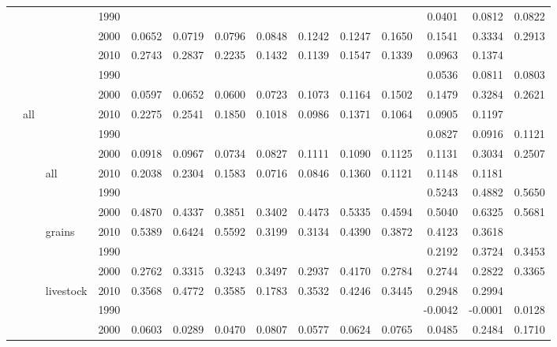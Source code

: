 \documentclass[]{elsarticle} %
\begin{document}
\begin{landscape}
\begin{longtable}[t]{>{}llllrrrrrrrrrr}
\endfoot
\bottomrule
\endlastfoot
 &  &  & 1990 &  &  &  &  &  &  &  & 0.0401 & 0.0812 & 0.0822\\
\nopagebreak
 &  &  & 2000 & 0.0652 & 0.0719 & 0.0796 & 0.0848 & 0.1242 & 0.1247 & 0.1650 & 0.1541 & 0.3334 & 0.2913\\
\nopagebreak
\multirow[t]{-3}{*}{\raggedright\arraybackslash \textbf{all}} &  &  & 2010 & 0.2743 & 0.2837 & 0.2235 & 0.1432 & 0.1139 & 0.1547 & 0.1339 & 0.0963 & 0.1374 & \\
\nopagebreak
 &  &  & 1990 &  &  &  &  &  &  &  & 0.0536 & 0.0811 & 0.0803\\
\nopagebreak
 &  &  & 2000 & 0.0597 & 0.0652 & 0.0600 & 0.0723 & 0.1073 & 0.1164 & 0.1502 & 0.1479 & 0.3284 & 0.2621\\
\nopagebreak
 & \multirow[t]{-6}{*}{\raggedright\arraybackslash all} &  & 2010 & 0.2275 & 0.2541 & 0.1850 & 0.1018 & 0.0986 & 0.1371 & 0.1064 & 0.0905 & 0.1197 & \\
\nopagebreak
 &  &  & 1990 &  &  &  &  &  &  &  & 0.0827 & 0.0916 & 0.1121\\
\nopagebreak
 &  &  & 2000 & 0.0918 & 0.0967 & 0.0734 & 0.0827 & 0.1111 & 0.1090 & 0.1125 & 0.1131 & 0.3034 & 0.2507\\
\nopagebreak
 &  & \multirow[t]{-9}{*}{\raggedright\arraybackslash all} & 2010 & 0.2038 & 0.2304 & 0.1583 & 0.0716 & 0.0846 & 0.1360 & 0.1121 & 0.1148 & 0.1181 & \\
\nopagebreak
 &  &  & 1990 &  &  &  &  &  &  &  & 0.5243 & 0.4882 & 0.5650\\
\nopagebreak
 &  &  & 2000 & 0.4870 & 0.4337 & 0.3851 & 0.3402 & 0.4473 & 0.5335 & 0.4594 & 0.5040 & 0.6325 & 0.5681\\
\nopagebreak
 &  & \multirow[t]{-3}{*}{\raggedright\arraybackslash grains} & 2010 & 0.5389 & 0.6424 & 0.5592 & 0.3199 & 0.3134 & 0.4390 & 0.3872 & 0.4123 & 0.3618 & \\
\nopagebreak
 &  &  & 1990 &  &  &  &  &  &  &  & 0.2192 & 0.3724 & 0.3453\\
\nopagebreak
 &  &  & 2000 & 0.2762 & 0.3315 & 0.3243 & 0.3497 & 0.2937 & 0.4170 & 0.2784 & 0.2744 & 0.2822 & 0.3365\\
\nopagebreak
 &  & \multirow[t]{-3}{*}{\raggedright\arraybackslash livestock} & 2010 & 0.3568 & 0.4772 & 0.3585 & 0.1783 & 0.3532 & 0.4246 & 0.3445 & 0.2948 & 0.2994 & \\
\nopagebreak
 &  &  & 1990 &  &  &  &  &  &  &  & -0.0042 & -0.0001 & 0.0128\\
\nopagebreak
 &  &  & 2000 & 0.0603 & 0.0289 & 0.0470 & 0.0807 & 0.0577 & 0.0624 & 0.0765 & 0.0485 & 0.2484 & 0.1710\\

\end{longtable}
\end{landscape}
\end{document}
